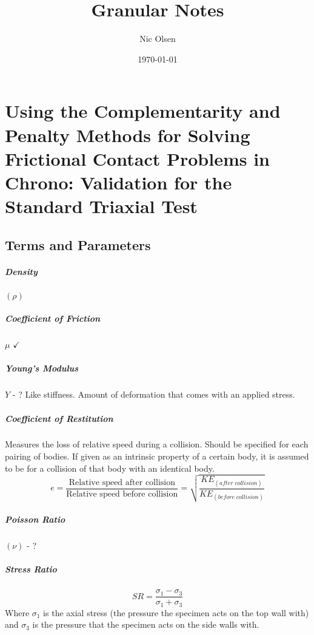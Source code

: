 \documentclass{book}
\begin{document}
\title{Granular Notes}
\author{Nic Olsen}
\date{\today}
\maketitle

\chapter[Triaxial]{Using the Complementarity and Penalty Methods for Solving Frictional Contact Problems in Chrono: Validation for the Standard Triaxial Test}

\section{Terms and Parameters}
\paragraph{Density} $(\rho)$
\paragraph{Coefficient of Friction} $\mu$ $\checkmark$
\paragraph{Young's Modulus} $Y$ - ? Like stiffness. Amount of deformation that comes with an applied stress.
\paragraph{Coefficient of Restitution} Measures the loss of relative speed during a collision. Should be specified for each pairing of bodies. If given as an intrinsic property of a certain body, it is assumed to be for a collision of that body with an identical body.
\begin{equation}
e = \frac{\text{Relative speed after collision}}{\text{Relative speed before collision}} = \sqrt{\frac{KE_{(after \; collision)}}{KE_{(before \; collision)}}}
\end{equation}

\paragraph{Poisson Ratio} $(\nu)$ - ?

\paragraph{Stress Ratio}
\begin{equation}
	SR = \frac{\sigma_1-\sigma_3}{\sigma_1+\sigma_3}
\end{equation}
Where $\sigma_1$ is the axial stress (the pressure the specimen acts on the top wall with) and $\sigma_3$ is the pressure that the specimen acts on the side walls with.
\end{document}
